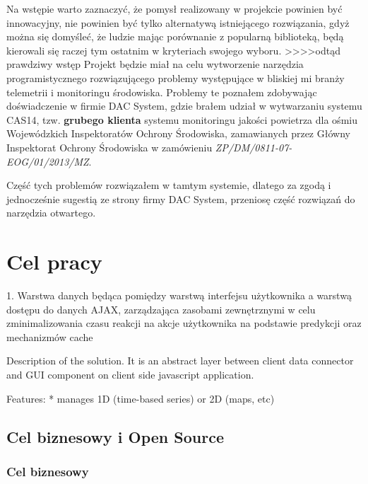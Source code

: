 Na wstępie warto zaznaczyć, że pomysł realizowany w projekcie powinien być innowacyjny, nie powinien być tylko alternatywą istniejącego rozwiązania, gdyż można się domyśleć, że ludzie mając porównanie z popularną biblioteką, będą kierowali się raczej tym ostatnim w kryteriach swojego wyboru.
>>>>odtąd prawdziwy wstęp
Projekt będzie miał na celu wytworzenie narzędzia programistycznego rozwiązującego problemy występujące w bliskiej mi branży telemetrii i monitoringu środowiska. Problemy te poznałem zdobywając doświadczenie w firmie DAC System, gdzie brałem udział w wytwarzaniu systemu CAS14, tzw. \textbf{grubego klienta} systemu monitoringu jakości powietrza dla ośmiu Wojewódzkich Inspektoratów Ochrony Środowiska, zamawianych przez Główny Inspektorat Ochrony Środowiska w zamówieniu \textsl{ZP/DM/0811-07-EOG/01/2013/MZ}.

Część tych problemów rozwiązałem w tamtym systemie, dlatego za zgodą i jednocześnie sugestią ze strony firmy DAC System, przeniosę część rozwiązań do narzędzia otwartego.



\section{Cel pracy}

1. Warstwa danych będąca pomiędzy warstwą interfejsu użytkownika a warstwą dostępu do danych AJAX, zarządzająca zasobami zewnętrznymi w celu zminimalizowania czasu reakcji na akcje użytkownika na podstawie predykcji oraz mechanizmów cache


Description of the solution.
It is an abstract layer between client data connector and GUI component on client side javascript application.

Features:
* manages 1D (time-based series) or 2D (maps, etc)

\subsection{Cel biznesowy i Open Source}

\subsubsection*{Cel biznesowy}
